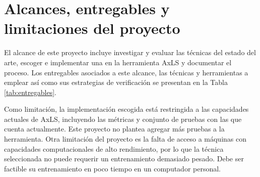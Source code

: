 \section{Alcances, entregables y limitaciones del proyecto}

El alcance de este proyecto incluye investigar y evaluar las técnicas del estado
del arte, escoger e implementar una en la herramienta AxLS y documentar el
proceso. Los entregables asociados a este alcance, las técnicas y herramientas a emplear así
como sus estrategias de verificación se presentan en la Tabla \ref{tab:entregables}.

Como limitación, la implementación escogida está restringida a las capacidades
actuales de AxLS, incluyendo las métricas y conjunto de pruebas con las que
cuenta actualmente. Este proyecto no plantea agregar más pruebas a la
herramienta.
Otra limitación del proyecto es la falta de acceso a máquinas con capacidades
computacionales de alto rendimiento, por lo que la técnica seleccionada no
puede requerir un entrenamiento demasiado pesado. Debe ser factible su
entrenamiento en poco tiempo en un computador personal.


